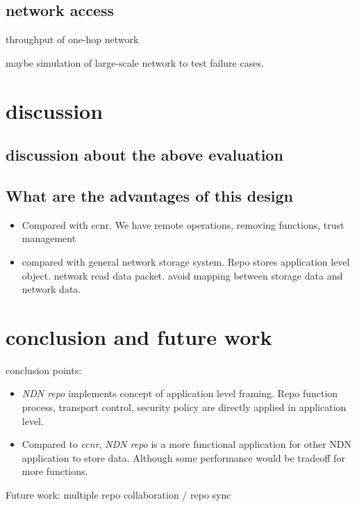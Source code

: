 \documentclass[conference]{IEEEtran}
\begin{document}
\subsection{network access}
throughput of one-hop network

maybe simulation of large-scale network to test failure cases.

\section{discussion} \label{section-discussion}
\subsection{discussion about the above evaluation}

\subsection{What are the advantages of this design}

\begin{itemize}
\item Compared with ccnr. We have remote operations, removing functions, trust management
\item compared with general network storage system. Repo stores application level object. network read data packet. avoid mapping between storage data and network data.
\end{itemize}

\section{conclusion and future work} \label{section-conclusion}
conclusion points:
\begin{itemize}
\item \emph{NDN repo} implements concept of application level framing. Repo function process, transport control, security policy are directly applied in application level.
\item Compared to \emph{ccnr}, \emph{NDN repo} is a more functional application for other NDN application to store data. Although some performance would be tradeoff for more functions.
\end{itemize}

Future work: multiple repo collaboration / repo sync



\end{document}
